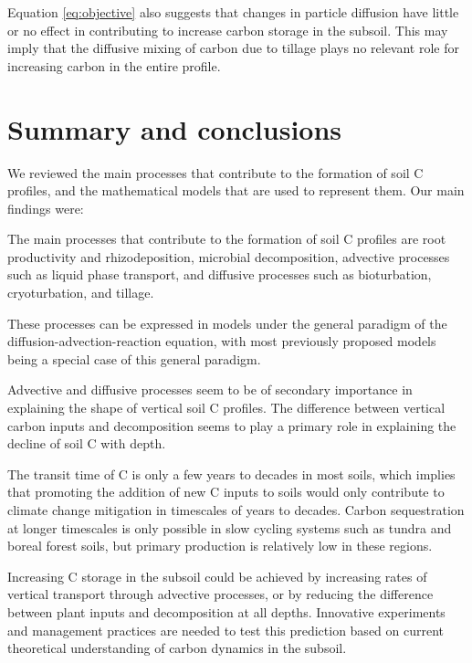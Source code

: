 \documentclass[11pt, oneside, a4paper]{article}   	%
\begin{document}
Equation \ref{eq:objective} also suggests that changes in particle diffusion have little or no effect in contributing to increase carbon storage in the subsoil. This may imply that the diffusive mixing of carbon due to tillage plays no relevant role for increasing carbon in the entire profile. 

\section{Summary and conclusions}
We reviewed the main processes that contribute to the formation of soil C profiles, and the mathematical models that are used to represent them. 
Our main findings were: 
\begin{enumerate*}
\item The main processes that contribute to the formation of soil C profiles are root productivity and rhizodeposition, microbial decomposition, advective processes such as liquid phase transport, and diffusive processes such as bioturbation, cryoturbation, and tillage. 
\item These processes can be expressed in models under the general paradigm of the diffusion-advection-reaction equation, with most previously proposed models being a special case of this general paradigm. 
\item Advective and diffusive processes seem to be of secondary importance in explaining the shape of vertical soil C profiles. The difference between vertical carbon inputs and decomposition seems to play a primary role in explaining the decline of soil C with depth. 
\item The transit time of C is only a few years to decades in most soils, which implies that promoting the addition of new C inputs to soils would only contribute to climate change mitigation in timescales of years to decades. Carbon sequestration at longer timescales is only possible in slow cycling systems such as tundra and boreal forest soils, but primary production is relatively low in these regions.
\item Increasing C storage in the subsoil could be achieved by increasing rates of vertical transport through advective processes, or by reducing the difference between plant inputs and decomposition at all depths. Innovative experiments and management practices are needed to test this prediction based on current theoretical understanding of carbon dynamics in the subsoil. 
\end{enumerate*}
\end{document}
